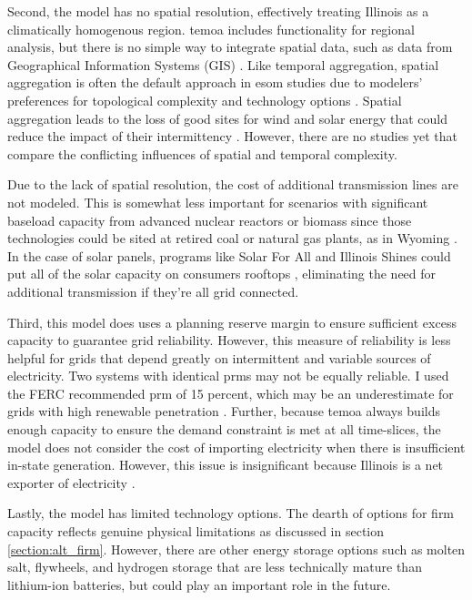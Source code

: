 Second, the model has no spatial resolution, effectively treating Illinois as a
climatically homogenous region. \gls{temoa} includes functionality for regional
analysis, but there is no simple way to integrate spatial data, such
as data from Geographical Information Systems (GIS) \cite{martinez-gordon_review_2021}.
Like temporal aggregation, spatial aggregation is often the default approach in
\gls{esom} studies due to modelers' preferences for topological complexity and
technology options \cite{martinez-gordon_review_2021,poncelet_impact_2016}. Spatial
aggregation leads to the loss of good sites for wind and solar energy that could
reduce the impact of their intermittency \cite{fleischer_minimising_2020}. However,
there are no studies yet that compare the conflicting influences of spatial and temporal
complexity.

Due to the lack of spatial resolution, the cost of additional transmission lines
are not modeled. This is somewhat less important for scenarios with significant
baseload capacity from advanced nuclear reactors or biomass since those technologies
could be sited at retired coal or natural gas plants, as in Wyoming
\cite{associated_press_bill_2021}. In the case of solar panels, programs like Solar
For All and Illinois Shines \cite{chicago_illinois_nodate, noauthor_illinois_nodate}
could put all of the solar capacity on consumers rooftops \cite{lopez_us_2012},
eliminating the need for additional transmission if they're all grid connected.

Third, this model does uses a planning reserve margin to ensure sufficient
excess capacity to guarantee grid reliability. However, this measure of reliability
is less helpful for grids that depend greatly on intermittent and variable sources
of electricity. Two systems with identical \glspl{prm} may not be equally reliable.
I used the FERC recommended \gls{prm} of 15 percent, which may be
an underestimate for grids with high renewable penetration \cite{milligan_methods_2011}.
Further, because \gls{temoa} always builds enough capacity to ensure the demand
constraint is met at all time-slices, the model does not consider the cost of
importing electricity when there is insufficient in-state generation. However,
this issue is insignificant because Illinois is a net exporter of electricity
\cite{energy_information_administration_eia_nodate}.

Lastly, the model has limited technology options. The dearth of options for
firm capacity reflects genuine physical limitations as discussed in section \ref{section:alt_firm}.
However, there are other energy storage options such as molten salt, flywheels,
and hydrogen storage that are less technically mature than lithium-ion batteries,
but could play an important role in the future.
